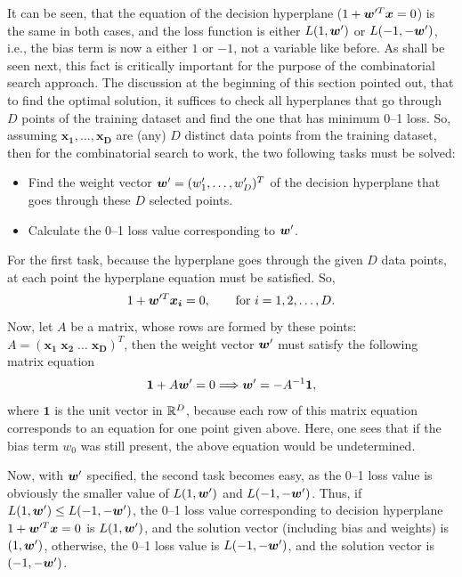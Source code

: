 It can be seen, that the equation of the decision hyperplane ($1 +
\boldsymbol{w}'^T \boldsymbol{x} = 0$) is the same in both cases, and the loss
function is either $L(1, \boldsymbol{w}')$ or $L(-1, -\boldsymbol{w}')$, i.e., the bias term
is now a either $1$ or $-1$, not a variable like before. As shall be
seen next, this fact is critically important for the purpose of the
combinatorial search approach. The discussion at the beginning of this
section pointed out, that to find the optimal solution, it suffices to
check all hyperplanes that go through $D$ points of the training
dataset and find the one that has minimum 0--1 loss. So, assuming
$\boldsymbol{x_1}, \dots, \boldsymbol{x_D}$ are (any) $D$ distinct
data points from the training dataset, then for the combinatorial
search to work, the two following tasks must be solved:
\begin{itemize}
\item Find the weight vector $\boldsymbol{w}'=(w'_1, \dots, w'_D)^T$ of the
  decision hyperplane that goes through these $D$ selected points.
\item Calculate the 0--1 loss value corresponding to $\boldsymbol{w}'$.
\end{itemize}

For the first task, because the hyperplane goes through the given $D$
data points, at each point the hyperplane equation must be
satisfied. So,
$$ 1+ \boldsymbol{w}'^T\boldsymbol{x_i} = 0, \quad\quad \text{for } i = 1, 2, \dots, D.$$
Now, let $A$ be a matrix, whose rows are formed by these points: 
$A =(\boldsymbol{x_1}\; \boldsymbol{x_2}\; \dots \; \boldsymbol{x_D})^T$,
then the weight vector $\boldsymbol{w}'$ must satisfy the following matrix equation 
\begin{equation}\label{eq:matrix}
\boldsymbol{1} + A \boldsymbol{w}' = 0 \Longrightarrow \boldsymbol{w}' = -A^{-1}\boldsymbol{1},
\end{equation}
where $\boldsymbol{1}$ is the unit vector in $\mathbb{R}^D$, because each row
of this matrix equation corresponds to an equation for one point given
above. Here, one sees that if the bias term $w_0$ was still present,
the above equation would be undetermined.

Now, with $\boldsymbol{w}'$ specified, the second task becomes easy, as the 0--1
loss value is obviously the smaller value of $L(1,\boldsymbol{w}')$ and $L(-1,
-\boldsymbol{w}')$. Thus, if $L(1,\boldsymbol{w}') \leq L(-1,-\boldsymbol{w}')$, the 0--1 loss value
corresponding to decision hyperplane $1+\boldsymbol{w}'^T\boldsymbol{x} = 0$ is
$L(1,\boldsymbol{w}')$, and the solution vector (including bias and weights) is
$(1, \boldsymbol{w}')$, otherwise, the 0--1 loss value is $L(-1,-\boldsymbol{w}')$, and the
solution vector is $(-1,-\boldsymbol{w}')$.

